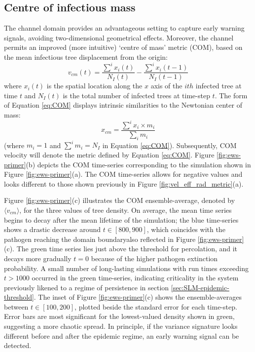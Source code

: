 \subsection{Centre of infectious mass}

The channel domain provides an advantageous setting to capture early warning signals, avoiding two-dimensional geometrical effects.
Moreover, the channel permits an improved (more intuitive) `centre of mass' metric (COM), based on the mean infectious tree displacement from the origin:
\begin{equation}
   v_{cm}(t) = \frac{\sum^i x_i(t)}{N_I(t)} - \frac{\sum^i x_i(t-1)}{N_I(t-1)}
   \label{eq:COM}
\end{equation}
where $x_i(t)$ is the spatial location along the $x$ axis of the $ith$ infected tree at 
time $t$ and $N_I(t)$ is the total number of infected trees at time-step $t$. 
 The form of Equation \ref{eq:COM} displays intrinsic similarities to the Newtonian center of mass:
 \[x_{cm} = \frac{\sum^i x_i\times m_i}{\sum_i m_i}\]
(where $m_i=1$ and $\sum^im_i= N_I$ in Equation \ref{eq:COM}).
Subsequently, COM velocity will denote the metric defined by Equation \ref{eq:COM}. 
Figure \ref{fig:ews-primer}(b) depicts the COM time-series corresponding to the simulation shown in Figure \ref{fig:ews-primer}(a). 
The COM time-series allows for negative values and looks different to those shown previously in Figure \ref{fig:vel_eff_rad_metric}(a).

Figure \ref{fig:ews-primer}(c) illustrates the COM ensemble-average, denoted by $\langle v_{cm}\rangle$, for the three values of tree density.
On average, the mean time series begins to decay after the mean lifetime of the simulation; the blue time-series shows a drastic decrease around $t \in [800, 900]$, which coincides with the pathogen reaching the domain boundary\textemdash also reflected in Figure \ref{fig:ews-primer}(c).
The green time series lies just above the threshold for percolation, and it decays more gradually $t=0$ because of the higher pathogen extinction probability. 
A small number of long-lasting simulations with run times exceeding $t>1000$ occurred in the green time-series, indicating criticality in the system\textemdash 
previously likened to a regime of persistence in section \ref{sec:SLM-epidemic-threshold}.
The inset of Figure \ref{fig:ews-primer}(c) shows the ensemble-averages between $t\in [100, 200]$, plotted beside the standard error for each time-step.
Error bars are most significant for the lowest-valued density shown in green, suggesting a more chaotic spread.
In principle, if the variance signature looks different before and after the epidemic regime, an early warning signal can be detected. 

